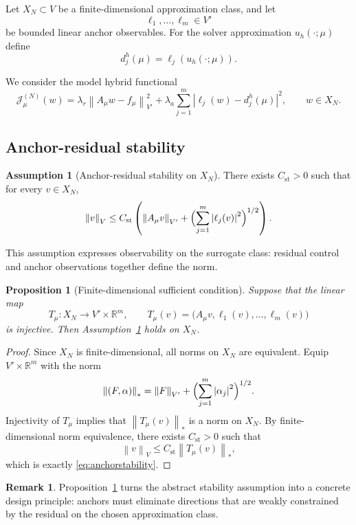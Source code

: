 \documentclass[preprint,12pt]{elsarticle}
\newtheorem{proposition}[theorem]{Proposition}
\theoremstyle{definition}
\newtheorem{remark}[theorem]{Remark}
\newtheorem{assumption}[theorem]{Assumption}
\numberwithin{equation}{section}
\newcommand{\R}{\mathbb{R}}
\newcommand{\norm}[1]{\left\lVert #1 \right\rVert}
\newcommand{\abs}[1]{\left\lvert #1 \right\rvert}
\begin{document}
Let $X_N\subset V$ be a finite-dimensional approximation class, and let
\[
\ell_1,\dots,\ell_m\in V'
\]
be bounded linear anchor observables. For the solver approximation $u_h(\cdot;\mu)$ define
\[
d_j^h(\mu)=\ell_j(u_h(\cdot;\mu)).
\]

We consider the model hybrid functional
\begin{equation}
\mathcal{J}^{(N)}_\mu(w)=
\lambda_r\norm{A_\mu w-f_\mu}_{V'}^2
+\lambda_a\sum_{j=1}^m\abs{\ell_j(w)-d_j^h(\mu)}^2,
\qquad w\in X_N.
\label{eq:strictloss}
\end{equation}

\subsection{Anchor-residual stability}

\begin{assumption}[Anchor-residual stability on $X_N$]
\label{ass:stability}
There exists $C_{\mathrm{st}}>0$ such that for every $v\in X_N$,
\begin{equation}
\norm{v}_V
\le
C_{\mathrm{st}}
\left(
\norm{A_\mu v}_{V'}
+
\Bigl(\sum_{j=1}^m\abs{\ell_j(v)}^2\Bigr)^{1/2}
\right).
\label{eq:anchorstability}
\end{equation}
\end{assumption}

This assumption expresses observability on the surrogate class: residual control and anchor observations together define the norm.

\begin{proposition}[Finite-dimensional sufficient condition]
\label{prop:suff}
Suppose that the linear map
\[
T_\mu:X_N\to V'\times\R^m,
\qquad
T_\mu(v)=\bigl(A_\mu v,\ell_1(v),\dots,\ell_m(v)\bigr)
\]
is injective. Then Assumption~\ref{ass:stability} holds on $X_N$.
\end{proposition}

\begin{proof}
Since $X_N$ is finite-dimensional, all norms on $X_N$ are equivalent. Equip $V'\times\R^m$ with the norm
\[
\norm{(F,\alpha)}_{*}=\norm{F}_{V'}+\Bigl(\sum_{j=1}^m\abs{\alpha_j}^2\Bigr)^{1/2}.
\]
Injectivity of $T_\mu$ implies that $\norm{T_\mu(v)}_*$ is a norm on $X_N$. By finite-dimensional norm equivalence, there exists $C_{\mathrm{st}}>0$ such that
\[
\norm{v}_V\le C_{\mathrm{st}}\norm{T_\mu(v)}_*,
\]
which is exactly \eqref{eq:anchorstability}.
\end{proof}

\begin{remark}
Proposition~\ref{prop:suff} turns the abstract stability assumption into a concrete design principle: anchors must eliminate directions that are weakly constrained by the residual on the chosen approximation class.
\end{remark}
\end{document}
